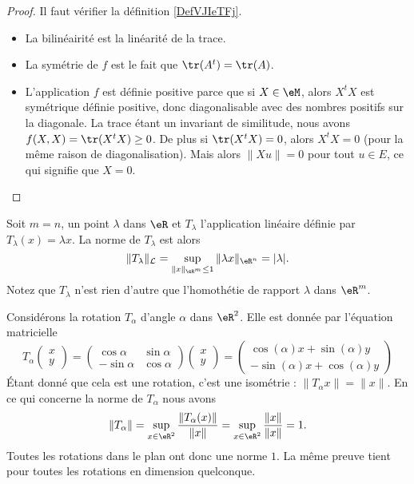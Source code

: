 \begin{proof}
    Il faut vérifier la définition \ref{DefVJIeTFj}.
    \begin{itemize}
        \item La bilinéairité est la linéarité de la trace.
        \item La symétrie de \( f\) est le fait que \( \tr(A^t)=\tr(A)\).
        \item L'application \( f\) est définie positive parce que si \( X\in \eM\), alors \( X^tX\) est symétrique définie positive, donc diagonalisable avec des nombres positifs sur la diagonale. La trace étant un invariant de similitude, nous avons \( f(X,X)=\tr(X^tX)\geq 0\). De plus si \( \tr(X^tX)=0\), alors \( X^tX=0\) (pour la même raison de diagonalisation). Mais alors \( \| Xu \|=0\) pour tout \( u\in E\), ce qui signifie que \( X=0\).
    \end{itemize}
\end{proof}

\begin{example}
	Soit $m=n$, un point $\lambda$ dans $\eR$ et $T_{\lambda}$ l'application linéaire définie par $T_{\lambda}(x)=\lambda x$. La norme de $T_{\lambda}$ est alors
\[
\|T_{\lambda}\|_{\mathcal{L}}=\sup_{\|x\|_{\eR^m}\leq 1}\|\lambda x\|_{\eR^n}= |\lambda|.
\]
Notez que $T_{\lambda}$ n'est rien d'autre que l'homothétie de rapport $\lambda$ dans $\eR^m$.
\end{example}

\begin{example}
	Considérons la rotation $T_{\alpha}$ d'angle $\alpha$ dans $\eR^2$. Elle est donnée par l'équation matricielle
	\begin{equation}
		T_{\alpha}\begin{pmatrix}
			x	\\ 
			y	
		\end{pmatrix}=\begin{pmatrix}
			\cos\alpha	&	\sin\alpha	\\ 
			-\sin\alpha	&	\cos\alpha	
		\end{pmatrix}\begin{pmatrix}
			x	\\ 
			y	
		\end{pmatrix}=\begin{pmatrix}
			\cos(\alpha)x+\sin(\alpha)y	\\ 
			-\sin(\alpha)x+\cos(\alpha)y	
		\end{pmatrix}
	\end{equation}
	Étant donné que cela est une rotation, c'est une isométrie : $\| T_{\alpha}x \|=\| x \|$. En ce qui concerne la norme de $T_{\alpha}$ nous avons
	\begin{equation}
		\| T_{\alpha} \|=\sup_{x\in\eR^2}\frac{ \| T_{\alpha}(x) \| }{ \| x \| }=\sup_{x\in\eR^2}\frac{ \| x \| }{ \| x \| }=1.
	\end{equation}
	Toutes les rotations dans le plan ont donc une norme $1$. La même preuve tient pour toutes les rotations en dimension quelconque. 
\end{example}

